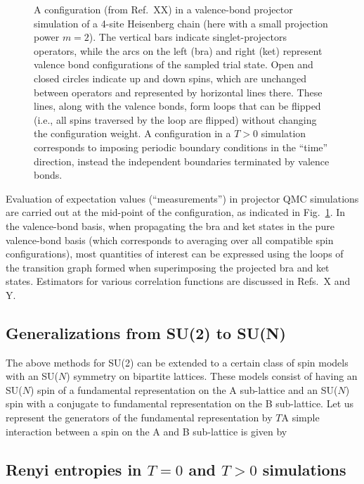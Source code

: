 \documentclass[range]{ar2e}
\begin{document}
\begin{figure}
\centerline{}
\caption{A configuration (from Ref.~XX) in a valence-bond projector simulation of a 4-site Heisenberg chain (here with a small
projection power $m=2$). The vertical bars indicate singlet-projectors operators, while the arcs on the left (bra) and right (ket) 
represent valence bond configurations of the sampled trial state. Open and closed circles indicate up and down spins, which are unchanged 
between operators and represented by horizontal lines there. These lines, along with the valence bonds, form loops that can be flipped
(i.e., all spins traversed by the loop are flipped) without changing the configuration weight. A configuration in a $T>0$ simulation 
corresponds to imposing periodic boundary conditions in the ``time'' direction, instead the independent boundaries
terminated by valence bonds.}
\label{loops}
\end{figure}

Evaluation of expectation values (``measurements'') in projector QMC simulations are carried out at the mid-point of the configuration,
as indicated in Fig.~\ref{loops}. In the valence-bond basis, when propagating the bra and ket states in the pure valence-bond basis (which 
corresponds to averaging over all compatible spin configurations), most quantities of interest can be expressed using the loops of the
transition graph formed when superimposing the projected bra and ket states. Estimators for various correlation functions are discussed
in Refs.~X and Y.

\subsection {Generalizations from SU(2) to SU(N)}
\label{ss:su2N}

The above methods for SU(2) can be extended to a certain
class of spin models with an SU($N$) symmetry on bipartite
lattices. These models consist of having an SU($N$) spin of a
fundamental representation on the A sub-lattice and an SU($N$) spin with
a conjugate to fundamental representation on the B sub-lattice. Let us
represent the generators of the fundamental representation by $T$A
simple interaction between a spin on the A and B sub-lattice is given
by 



\subsection{Renyi entropies in $T=0$ and $T>0$ simulations} 
\label{ss:renyi}
\end{document}
